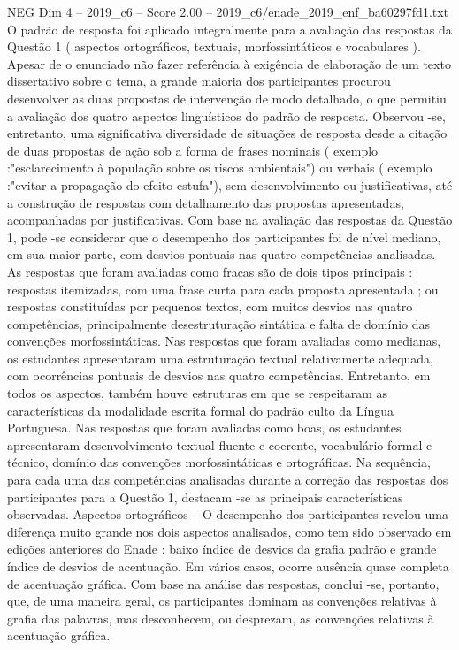 \begin{textsample}{NEG Dim 4 – 2019\_c6 – Score 2.00 – 2019\_c6/enade\_2019\_enf\_ba60297fd1.txt}
O padrão de resposta foi aplicado integralmente para a avaliação das respostas da Questão 1 ( aspectos ortográficos, textuais, morfossintáticos e vocabulares ).
Apesar de o enunciado não fazer referência à exigência de elaboração de um texto dissertativo sobre o tema, a grande maioria dos participantes procurou desenvolver as duas propostas de intervenção de modo detalhado, o que permitiu a avaliação dos quatro aspectos linguísticos do padrão de resposta.
Observou -se, entretanto, uma significativa diversidade de situações de resposta desde a citação de duas propostas de ação sob a forma de frases nominais ( exemplo :"esclarecimento à população sobre os riscos ambientais") ou verbais ( exemplo :"evitar a propagação do efeito estufa"), sem desenvolvimento ou justificativas, até a construção de respostas com detalhamento das propostas apresentadas, acompanhadas por justificativas.
Com base na avaliação das respostas da Questão 1, pode -se considerar que o desempenho dos participantes foi de nível mediano, em sua maior parte, com desvios pontuais nas quatro competências analisadas.
As respostas que foram avaliadas como fracas são de dois tipos principais : respostas itemizadas, com uma frase curta para cada proposta apresentada ; ou respostas constituídas por pequenos textos, com muitos desvios nas quatro competências, principalmente desestruturação sintática e falta de domínio das convenções morfossintáticas.
Nas respostas que foram avaliadas como medianas, os estudantes apresentaram uma estruturação textual relativamente adequada, com ocorrências pontuais de desvios nas quatro competências.
Entretanto, em todos os aspectos, também houve estruturas em que se respeitaram as características da modalidade escrita formal do padrão culto da Língua Portuguesa.
Nas respostas que foram avaliadas como boas, os estudantes apresentaram desenvolvimento textual fluente e coerente, vocabulário formal e técnico, domínio das convenções morfossintáticas e ortográficas.
Na sequência, para cada uma das competências analisadas durante a correção das respostas dos participantes para a Questão 1, destacam -se as principais características observadas.
Aspectos ortográficos – O desempenho dos participantes revelou uma diferença muito grande nos dois aspectos analisados, como tem sido observado em edições anteriores do Enade : baixo índice de desvios da grafia padrão e grande índice de desvios de acentuação.
Em vários casos, ocorre ausência quase completa de acentuação gráfica.
Com base na análise das respostas, conclui -se, portanto, que, de uma maneira geral, os participantes dominam as convenções relativas à grafia das palavras, mas desconhecem, ou desprezam, as convenções relativas à acentuação gráfica.

\end{textsample}
